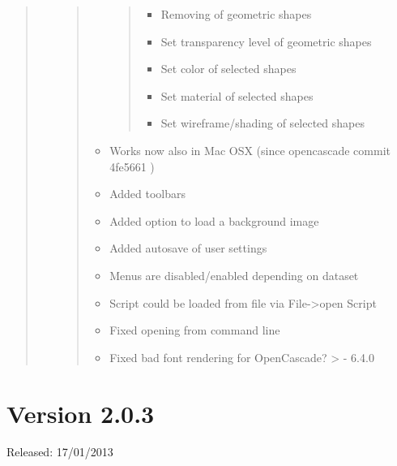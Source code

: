\documentclass[]{scrartcl}
\begin{document}
\begin{quote}
\begin{itemize}
\begin{quote}
\begin{itemize}
    \begin{quote}
    \begin{itemize}
    \itemsep1pt\parskip0pt
    \item
      Removing of geometric shapes
    \item
      Set transparency level of geometric shapes
    \item
      Set color of selected shapes
    \item
      Set material of selected shapes
    \item
      Set wireframe/shading of selected shapes
    \end{itemize}
    \end{quote}
  \item
    Works now also in Mac OSX (since opencascade commit 4fe5661 )
  \item
    Added toolbars
  \item
    Added option to load a background image
  \item
    Added autosave of user settings
  \item
    Menus are disabled/enabled depending on dataset
  \item
    Script could be loaded from file via File-\textgreater{}open Script
  \item
    Fixed opening from command line
  \item
    Fixed bad font rendering for OpenCascade? \textgreater{} - 6.4.0
  \end{itemize}
  \end{quote}
\end{itemize}
\end{quote}

\section{Version 2.0.3}

Released: 17/01/2013
\end{document}
